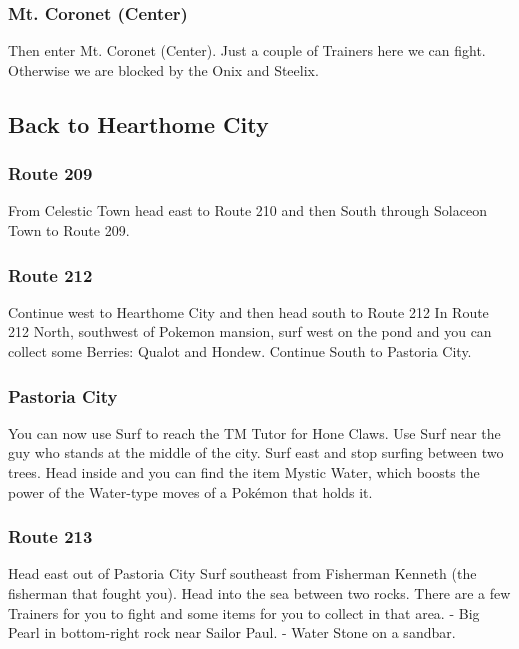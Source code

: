 \documentclass[11pt]{article}
\begin{document}
\subsubsection{Mt. Coronet (Center)}\label{subsubsec:mt.-coronet-(center)}
Then enter Mt. Coronet (Center).
Just a couple of Trainers here we can fight.
Otherwise we are blocked by the Onix and Steelix.




\subsection{Back to Hearthome City}\label{subsec:back-to-hearthome-city}

\subsubsection{Route 209}
From Celestic Town head east to Route 210 and then South through
Solaceon Town to Route 209.

\subsubsection{Route 212}
Continue west to Hearthome City and then head south to Route 212
In Route 212 North, southwest of Pokemon mansion, surf west on the pond and
you can collect some Berries: Qualot and Hondew.
Continue South to Pastoria City.

\subsubsection{Pastoria City}
You can now use Surf to reach the TM Tutor for Hone Claws.
Use Surf near the guy who stands at the middle of the city.
Surf east and stop surfing between two trees.
Head inside and you can find the item Mystic Water,
which boosts the power of the Water-type moves of a Pokémon that holds it.

\subsubsection{Route 213}
Head east out of Pastoria City
Surf southeast from Fisherman Kenneth (the fisherman that fought you).
Head into the sea between two rocks.
There are a few Trainers for you to fight and some items for you to collect in that area.
- Big Pearl in bottom-right rock near Sailor Paul.
- Water Stone on a sandbar.
\end{document}
